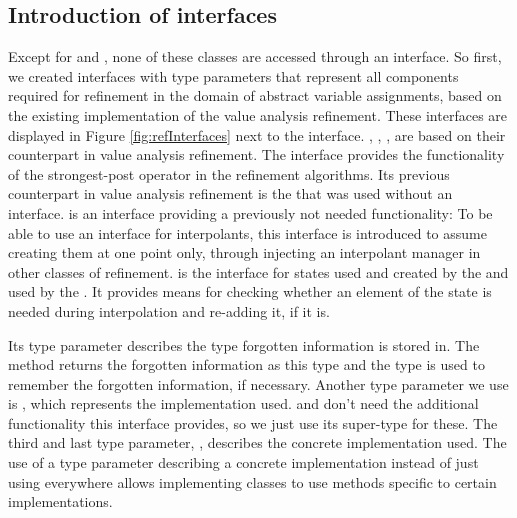 \subsection{Introduction of interfaces}
Except for  and , none of these classes are accessed through an interface.
So first, we created interfaces with type parameters that represent all components required for refinement in the domain of abstract variable assignments, based on the existing implementation of the value analysis refinement. These interfaces are displayed in Figure \ref{fig:refInterfaces} next to the  interface.
, , ,  are based on their counterpart in value analysis refinement.
The interface  provides the functionality of the strongest-post operator in the refinement algorithms. Its previous counterpart in value analysis refinement is the  that was used without an interface.
 is an interface providing a previously not needed functionality:
To be able to use an interface for interpolants, this interface is introduced to assume creating them at one point only, through injecting an interpolant manager in other classes of refinement.
 is the interface for states used and created by the  and used by the .
It provides means for checking whether an element of the state is needed during interpolation and re-adding it, if it is.

Its type parameter  describes the type forgotten information is stored in.
The method  returns the forgotten information as this type and the type is used to remember the forgotten information, if necessary.
Another type parameter we use is , which represents the  implementation used.  and  don't need the additional functionality this interface provides,
so we just use its super-type  for these.
The third and last type parameter, , describes the concrete  implementation used.
The use of a type parameter describing a concrete implementation instead of just using  everywhere
allows implementing classes to use methods specific to certain implementations.

